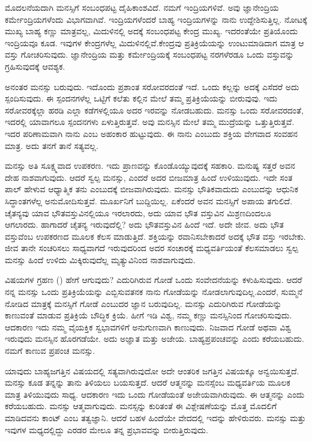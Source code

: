 ಮೊದಲನೆಯದಾಗಿ ಮನಸ್ಸಿಗೆ ಸಂಬಂಧಪಟ್ಟ ದೈಹಿಕಾಂಶವಿದೆ. ನಮಗೆ ಇಂದ್ರಿಯಗಳಿವೆ. ಅವು ಜ್ಞಾನೇಂದ್ರಿಯ ಕರ್ಮೇಂದ್ರಿಯಗಳೆಂದು ವಿಭಾಗವಾಗಿವೆ. ಇಂದ್ರಿಯಗಳೆಂದರೆ ಬಾಹ್ಯ ಇಂದ್ರಿಯಗಳನ್ನು ನಾನು ಉದ್ದೇಶಿಸುತ್ತಿಲ್ಲ. ನೋಟಕ್ಕೆ ಮುಖ್ಯ ಬಾಹ್ಯ ಕಣ್ಣು ಮಾತ್ರವಲ್ಲ, ಮಿದುಳಿನಲ್ಲಿ ಅದಕ್ಕೆ ಸಂಬಂಧಪಟ್ಟ ಕೇಂದ್ರ ಮುಖ್ಯ. ಇದರಂತೆಯೇ ಪ್ರತಿಯೊಂದು ಇಂದ್ರಿಯವೂ ಕೂಡ. ಇವುಗಳ ಕೇಂದ್ರಗಳೆಲ್ಲ ಮಿದುಳಿನಲ್ಲಿವೆ.\break ಕೇಂದ್ರವು ಪ್ರತಿಕ್ರಿಯೆಯನ್ನು ಉಂಟುಮಾಡಿದಾಗ ಮಾತ್ರ ಆ ವಸ್ತು ಗೋಚರಿಸುವುದು. ಜ್ಞಾನೇಂದ್ರಿಯ ಮತ್ತು ಕರ್ಮೇಂದ್ರಿಯಕ್ಕೆ ಸಂಬಂಧಪಟ್ಟ ನರಗಳೆರಡೂ ಒಂದು ವಸ್ತುವನ್ನು ಗ್ರಹಿಸುವುದಕ್ಕೆ ಆವಶ್ಯಕ.

ಅನಂತರ ಮನಸ್ಸು ಬರುವುದು. ಇದೊಂದು ಪ್ರಶಾಂತ ಸರೋವರದಂತೆ ಇದೆ. ಒಂದು ಕಲ್ಲನ್ನು ಅದಕ್ಕೆ ಎಸೆದರೆ ಅದು ಸ್ಪಂದಿಸುವುದು. ಈ ಸ್ಪಂದನಗಳೆಲ್ಲ ಒಟ್ಟಿಗೆ ಕಲೆತು ಕಲ್ಲಿನ ಮೇಲೆ ತಮ್ಮ ಪ್ರತಿಕ್ರಿಯೆಯನ್ನು ಬೀರುವುವು. ಇದು ಸರೋವರಕ್ಕೆಲ್ಲಾ ಹರಡಿ ಎಲ್ಲಾ ಕಡೆಗಳಲ್ಲಿಯೂ ಅದರ ಇರವನ್ನು ನೋಡಬಹುದು. ಮನಸ್ಸು ಒಂದು ಸರೋವರದಂತೆ, ಇದರಲ್ಲಿ ಯಾವಾಗಲೂ ಸ್ಪಂದನಗಳು ಏಳುತ್ತಿರುತ್ತವೆ. ಅವು ಮನಸ್ಸಿನ ಮೇಲೆ ತಮ್ಮ ಮುದ್ರೆಯನ್ನು ಒತ್ತುತ್ತಿರುತ್ತವೆ. ಇದರ ಪರಿಣಾಮವಾಗಿ ನಾನು ಎಂಬ ಅಹಂಕಾರ ಹುಟ್ಟುವುದು. ಈ ನಾನು ಎಂಬುದು ಶಕ್ತಿಯ ವೇಗವಾದ ಸಂವಹನ ಮಾತ್ರ. ಅದು ತನಗೆ ತಾನೆ ಸತ್ಯವಲ್ಲ.

ಮನಸ್ಸು ಅತಿ ಸೂಕ್ಷ್ಮವಾದ ಉಪಕರಣ. ಇದು ಪ್ರಾಣವನ್ನು ಕೊಂಡೊಯ್ಯುವುದಕ್ಕೆ ಸಹಕಾರಿ. ಮನುಷ್ಯ ಸತ್ತರೆ ಅವನ ದೇಹ ನಾಶವಾಗುವುದು. ಆದರೆ ಸ್ವಲ್ಪ ಮನಸ್ಸು, ಎಂದರೆ ಅದರ ಬೀಜಮಾತ್ರ ಹಿಂದೆ ಉಳಿಯುವುದು. ಇದೇ ಸಂತ ಪಾಲ್ ಹೇಳುವ ಆಧ್ಯಾತ್ಮಿಕ ತನು ಎಂಬುದಕ್ಕೆ ಬೀಜವಾಗಿರುವುದು. ಮನಸ್ಸು ಭೌತಿಕವಾದುದು ಎಂಬುದನ್ನು ಆಧುನಿಕ ಸಿದ್ಧಾಂತಗಳೆಲ್ಲ ಅನುಮೋದಿಸುತ್ತವೆ. ಮೂರ್ಖನಿಗೆ ಬುದ್ದಿಯಿಲ್ಲ. ಏಕೆಂದರೆ ಅವನ ಮನಸ್ಸಿಗೆ ಅಪಾಯ ತಗುಲಿದೆ. ಚೈತನ್ಯವು ಯಾವ ಭೌತವಸ್ತುವಿನಲ್ಲಿಯೂ ಇರಲಾರದು, ಅದು ಯಾವ ಭೌತ ವಸ್ತುವಿನ ಮಿಶ್ರಣದಿಂದಲೂ ಆಗಲಾರದು. ಹಾಗಾದರೆ ಚೈತನ್ಯ ಇರುವುದೆಲ್ಲಿ? ಅದು ಭೌತವಸ್ತುವಿನ ಹಿಂದೆ ಇದೆ. ಅದೇ ಜೀವ. ಅದು ಭೌತ ವಸ್ತುವೆಂಬ ಉಪಕರಣದ ಮೂಲಕ ಕೆಲಸ ಮಾಡುತ್ತಿದೆ. ಶಕ್ತಿಯನ್ನು ರವಾನಿಸಬೇಕಾದರೆ ಅದಕ್ಕೆ ಭೌತ ವಸ್ತು ಇರಬೇಕು. ಜೀವ ತಾನೇ ಸಂಚರಿಸಲು ಸಾಧ್ಯವಾಗದೆ ಇರುವುದರಿಂದ ಅದರ ಸಂಚಾರಕ್ಕೆ ಮಧ್ಯವರ್ತಿಯಂತೆ ಕೆಲಸಮಾಡಲು ಸ್ವಲ್ಪ ಮನಸ್ಸು ಹಿಂದೆ ಉಳಿದು ಮಿಕ್ಕಿರುವುದೆಲ್ಲ ಮೃತ್ಯುವಿನಿಂದ ನಾಶವಾಗುವುದು.

ವಿಷಯಗಳ ಗ್ರಹಣ () ಹೇಗೆ ಆಗುವುದು? ಎದುರಿಗಿರುವ ಗೋಡೆ ಒಂದು ಸಂವೇದನೆಯನ್ನು ಕಳುಹಿಸುವುದು. ಆದರೆ ನನ್ನ ಮನಸ್ಸು ಒಂದು ಪ್ರತಿಕ್ರಿಯೆಯನ್ನು ಎಬ್ಬಿಸುವತನಕ ನಾನು ಗೋಡೆಯನ್ನು ನೋಡಲಾಗುವುದಿಲ್ಲ.\break ಎಂದರೆ, ಸುಮ್ಮನೆ ನೋಡಿದ ಮಾತ್ರಕ್ಕೆ ಮನಸ್ಸಿಗೆ ಗೋಡೆ ಎಂಬುದರ ಜ್ಞಾನ ಬರುವುದಿಲ್ಲ. ಮನಸ್ಸು ಎದುರಿಗಿರುವ ಗೋಡೆಯನ್ನು ಕಾಣುವಂತೆ ಮಾಡುವ ಪ್ರತಿಕ್ರಿಯೆ ಬೌದ್ಧಿಕ ಕ್ರಿಯೆ. ಹೀಗೆ ಇಡಿ ವಿಶ್ವ, ನಮ್ಮ ಕಣ್ಣು ಮನಸ್ಸಿನಿಂದ ಗೋಚರಿಸುವುದು. ಆದಕಾರಣ ಇದು ನಮ್ಮ ವೈಯಕ್ತಿಕ ಸ್ವಭಾವಗಳಿಗೆ ಅನುಗುಣವಾಗಿ ಕಾಣುವುದು. ನಿಜವಾದ ಗೋಡೆ ಅಥವಾ ವಿಶ್ವ ಇರುವುದು ಮನಸ್ಸಿನ ಹೊರಗಡೆಯೇ. ಅದು ಅಜ್ಞಾತ ಮತ್ತು ಅಜೇಯ. ಬಾಹ್ಯಪ್ರಪಂಚವನ್ನು  ಎಂದು ಕರೆಯಬಹುದು. ನಮಗೆ ಕಾಣುವ ಪ್ರಪಂಚ  ಮನಸ್ಸು.

ಯಾವುದು ಬಾಹ್ಯಜಗತ್ತಿನ ವಿಷಯದಲ್ಲಿ ಸತ್ಯವಾಗಿರುವುದೋ ಅದೇ ಆಂತರಿಕ ಜಗತ್ತಿನ ವಿಷಯಕ್ಕೂ ಅನ್ವಯಿಸುತ್ತದೆ. ಮನಸ್ಸು ಕೂಡ ತನ್ನನ್ನು ತಾನು ತಿಳಿಯಲು ಬಯಸುತ್ತದೆ. ಆದರೆ ಆತ್ಮನನ್ನು ಮನಸ್ಸೆಂಬ ಮಧ್ಯವರ್ತಿಯ ಮೂಲಕ ಮಾತ್ರ ತಿಳಿಯುವುದು ಸಾಧ್ಯ. ಆದಕಾರಣ ಇದು ಒಂದು ಗೋಡೆಯಂತೆ ಅಜೇಯವಾಗಿರುವುದು. ಈ ಆತ್ಮನನ್ನು  ಎಂದು ಕರೆಯಬಹುದು.  ಮನಸ್ಸು ಆತ್ಮವಾಗುವುದು. ಮನಸ್ಸನ್ನು ಕುರಿತಂತೆ ಈ ವಿಶ್ಲೇಷಣೆಯನ್ನು ಮೊತ್ತ ಮೊದಲಿಗೆ ಮಾಡಿದವನು ಕಾಂಟ್ ಎಂಬ ತತ್ವಜ್ಞಾನಿ. ಆದರೆ ಬಹಳ ಹಿಂದೆಯೇ ವೇದದಲ್ಲಿ ಇದನ್ನು ಹೇಳಿರುವರು. ಮನಸ್ಸು  ಮತ್ತು  ಇವುಗಳ ಮಧ್ಯದಲ್ಲಿದ್ದು ಎರಡರ ಮೇಲೂ ತನ್ನ ಪ್ರಭಾವವನ್ನು ಬೀರುತ್ತಿರುವುದು.

